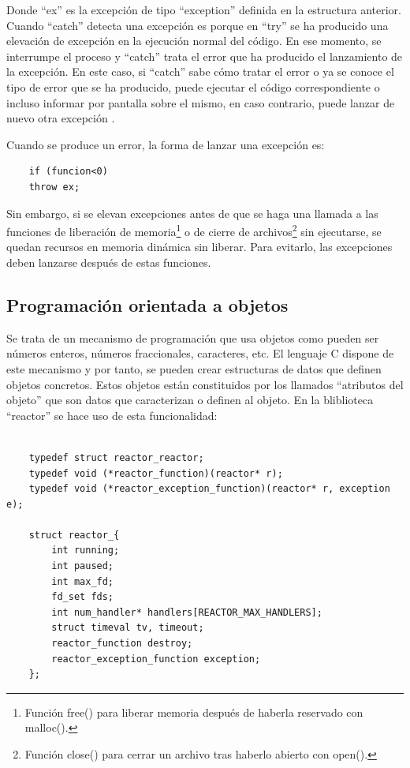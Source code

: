 Donde ``ex'' es la excepción de tipo ``exception'' definida en la estructura anterior. Cuando ``catch'' detecta una excepción es porque en ``try'' se ha producido una elevación de excepción en la ejecución normal del código. En ese momento, se interrumpe el proceso y ``catch'' trata el error que ha producido el lanzamiento de la excepción. En este caso, si ``catch'' sabe cómo tratar el error o ya se conoce el tipo de error que se ha producido, puede ejecutar el código correspondiente o incluso informar por pantalla sobre el mismo, en caso contrario, puede lanzar de nuevo otra excepción \citep[pág. 87--89]{tallerRPi}.

Cuando se produce un error, la forma de lanzar una excepción es:

    \begin{verbatim}
    if (funcion<0)
    throw ex;
    \end{verbatim}
Sin embargo, si se elevan excepciones antes de que se haga una llamada a las funciones de liberación de memoria\footnote{Función free() para liberar memoria después de haberla reservado con malloc().} o de cierre de archivos\footnote{Función close() para cerrar un archivo tras haberlo abierto con open().} sin ejecutarse, se quedan recursos en memoria dinámica sin liberar. Para evitarlo, las excepciones deben lanzarse después de estas funciones.

\subsection{Programación orientada a objetos} \label{s2_1_5}

Se trata de un mecanismo de programación que usa objetos como pueden ser números enteros, números fraccionales, caracteres, etc. El lenguaje C dispone de este mecanismo y por tanto, se pueden crear estructuras de datos que definen objetos concretos. Estos objetos están constituidos por los llamados ``atributos del objeto'' que son datos que caracterizan o definen al objeto. En la bliblioteca ``reactor'' se hace uso de esta funcionalidad: \\
    \begin{verbatim}
    
    typedef struct reactor_reactor;
    typedef void (*reactor_function)(reactor* r);
    typedef void (*reactor_exception_function)(reactor* r, exception e);
    
    struct reactor_{
        int running;
        int paused;
        int max_fd;
        fd_set fds;
        int num_handler* handlers[REACTOR_MAX_HANDLERS];
        struct timeval tv, timeout;
        reactor_function destroy;
        reactor_exception_function exception;
    };
    \end{verbatim}

